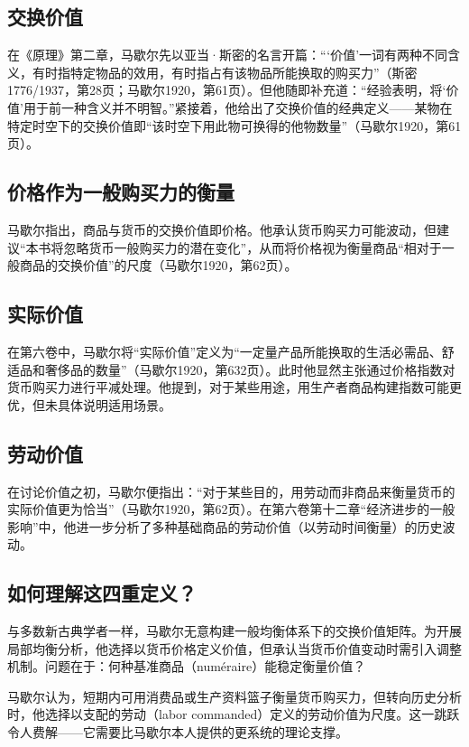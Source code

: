 \begin{translation}
\subsection{交换价值}

在《原理》第二章，马歇尔先以亚当·斯密的名言开篇：“‘价值’一词有两种不同含义，有时指特定物品的效用，有时指占有该物品所能换取的购买力”（斯密1776/1937，第28页；马歇尔1920，第61页）。但他随即补充道：“经验表明，将‘价值’用于前一种含义并不明智。”紧接着，他给出了交换价值的经典定义——某物在特定时空下的交换价值即“该时空下用此物可换得的他物数量”（马歇尔1920，第61页）。

\subsection{价格作为一般购买力的衡量}

马歇尔指出，商品与货币的交换价值即价格。他承认货币购买力可能波动，但建议“本书将忽略货币一般购买力的潜在变化”，从而将价格视为衡量商品“相对于一般商品的交换价值”的尺度（马歇尔1920，第62页）。

\subsection{实际价值}

在第六卷中，马歇尔将“实际价值”定义为“一定量产品所能换取的生活必需品、舒适品和奢侈品的数量”（马歇尔1920，第632页）。此时他显然主张通过价格指数对货币购买力进行平减处理。他提到，对于某些用途，用生产者商品构建指数可能更优，但未具体说明适用场景。

\subsection{劳动价值}

在讨论价值之初，马歇尔便指出：“对于某些目的，用劳动而非商品来衡量货币的实际价值更为恰当”（马歇尔1920，第62页）。在第六卷第十二章“经济进步的一般影响”中，他进一步分析了多种基础商品的劳动价值（以劳动时间衡量）的历史波动。

\subsection{如何理解这四重定义？}

与多数新古典学者一样，马歇尔无意构建一般均衡体系下的交换价值矩阵。为开展局部均衡分析，他选择以货币价格定义价值，但承认当货币价值变动时需引入调整机制。问题在于：何种基准商品（numéraire）能稳定衡量价值？

马歇尔认为，短期内可用消费品或生产资料篮子衡量货币购买力，但转向历史分析时，他选择以支配的劳动（labor commanded）定义的劳动价值为尺度。这一跳跃令人费解——它需要比马歇尔本人提供的更系统的理论支撑。


\end{translation}
